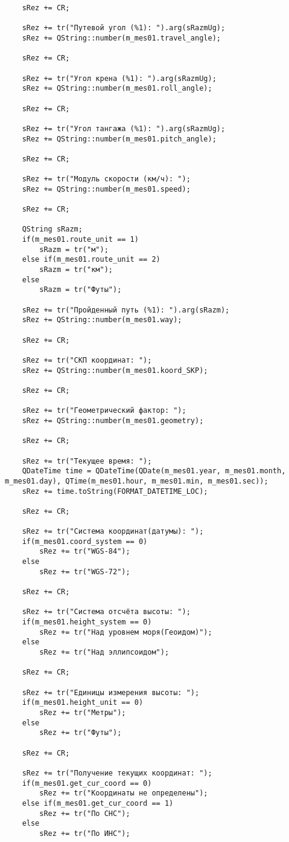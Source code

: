 \begin{verbatim}
	sRez += CR;

	sRez += tr("Путевой угол (%1): ").arg(sRazmUg);
	sRez += QString::number(m_mes01.travel_angle);

	sRez += CR;

	sRez += tr("Угол крена (%1): ").arg(sRazmUg);
	sRez += QString::number(m_mes01.roll_angle);

	sRez += CR;

	sRez += tr("Угол тангажа (%1): ").arg(sRazmUg);
	sRez += QString::number(m_mes01.pitch_angle);

	sRez += CR;

	sRez += tr("Модуль скорости (км/ч): ");
	sRez += QString::number(m_mes01.speed);

	sRez += CR;

	QString sRazm;
	if(m_mes01.route_unit == 1)
		sRazm = tr("м");
	else if(m_mes01.route_unit == 2)
		sRazm = tr("км");
	else
		sRazm = tr("Футы");

	sRez += tr("Пройденный путь (%1): ").arg(sRazm);
	sRez += QString::number(m_mes01.way);

	sRez += CR;

	sRez += tr("СКП координат: ");
	sRez += QString::number(m_mes01.koord_SKP);

	sRez += CR;

	sRez += tr("Геометрический фактор: ");
	sRez += QString::number(m_mes01.geometry);

	sRez += CR;

	sRez += tr("Текущее время: ");
	QDateTime time = QDateTime(QDate(m_mes01.year, m_mes01.month, m_mes01.day), QTime(m_mes01.hour, m_mes01.min, m_mes01.sec));
	sRez += time.toString(FORMAT_DATETIME_LOC);

	sRez += CR;

	sRez += tr("Система координат(датумы): ");
	if(m_mes01.coord_system == 0)
		sRez += tr("WGS-84");
	else
		sRez += tr("WGS-72");

	sRez += CR;

	sRez += tr("Система отсчёта высоты: ");
	if(m_mes01.height_system == 0)
		sRez += tr("Над уровнем моря(Геоидом)");
	else
		sRez += tr("Над эллипсоидом");

	sRez += CR;

	sRez += tr("Единицы измерения высоты: ");
	if(m_mes01.height_unit == 0)
		sRez += tr("Метры");
	else
		sRez += tr("Футы");

	sRez += CR;

	sRez += tr("Получение текущих координат: ");
	if(m_mes01.get_cur_coord == 0)
		sRez += tr("Координаты не определены");
	else if(m_mes01.get_cur_coord == 1)
		sRez += tr("По СНС");
	else
		sRez += tr("По ИНС");


\end{verbatim}
